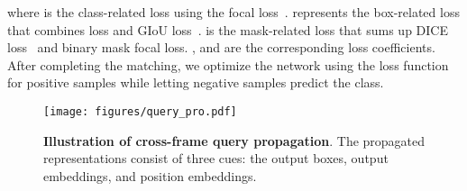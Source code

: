 \documentclass[10pt,twocolumn,letterpaper]{article}
\begin{document}
where  is the class-related loss using the focal loss~\cite{lin2017focal}. 
 represents the box-related loss that combines  loss and GIoU loss~\cite{rezatofighi2019generalized}.
 is the mask-related loss that sums up DICE loss~\cite{milletari2016v} and binary mask focal loss.
,  and  are the corresponding loss coefficients.
After completing the matching, we optimize the network using the loss function  for positive samples while letting negative samples predict the  class.



\begin{figure}
\centering
	\texttt{[image: figures/query\_pro.pdf]}
	\vspace{-10pt}
	\caption{\textbf{Illustration of cross-frame query propagation}. The propagated representations consist of three cues: the output boxes, output embeddings, and position embeddings.}
	\vspace{-3mm}
	\label{fig:query_pro}
\end{figure}
\end{document}
